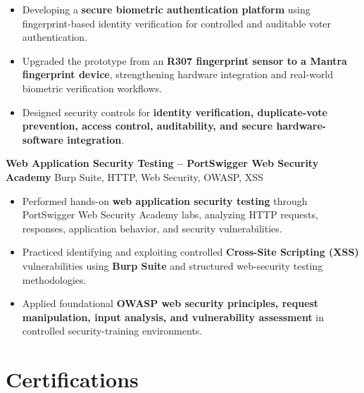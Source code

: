 \documentclass[a4paper,11pt]{article}
\newcommand{\resumeItem}[1]{
    \item \small{#1 \vspace{-2pt}}
}
\newcommand{\resumeProject}[2]{
    \vspace{2pt}
    \textbf{#1} \hfill {\small #2}
    \vspace{2pt}
}
\begin{document}
\begin{itemize}[leftmargin=*]

\resumeItem{Developing a \textbf{secure biometric authentication platform} using fingerprint-based identity verification for controlled and auditable voter authentication.}

\resumeItem{Upgraded the prototype from an \textbf{R307 fingerprint sensor to a Mantra fingerprint device}, strengthening hardware integration and real-world biometric verification workflows.}

\resumeItem{Designed security controls for \textbf{identity verification, duplicate-vote prevention, access control, auditability, and secure hardware-software integration}.}

\end{itemize}

\vspace{1mm}

\resumeProject
{Web Application Security Testing -- PortSwigger Web Security Academy}
{Burp Suite, HTTP, Web Security, OWASP, XSS}

\begin{itemize}[leftmargin=*]

\resumeItem{Performed hands-on \textbf{web application security testing} through PortSwigger Web Security Academy labs, analyzing HTTP requests, responses, application behavior, and security vulnerabilities.}

\resumeItem{Practiced identifying and exploiting controlled \textbf{Cross-Site Scripting (XSS)} vulnerabilities using \textbf{Burp Suite} and structured web-security testing methodologies.}

\resumeItem{Applied foundational \textbf{OWASP web security principles, request manipulation, input analysis, and vulnerability assessment} in controlled security-training environments.}

\end{itemize}

\vspace{-8pt}


\section{Certifications}
\end{document}
